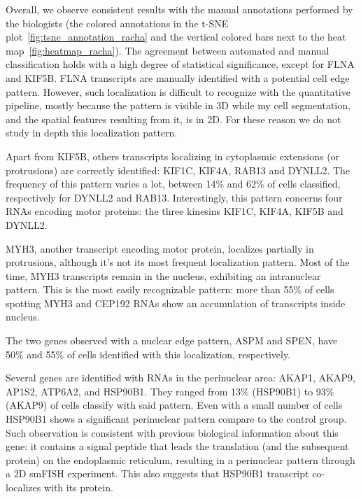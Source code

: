 Overall, we observe consistent results with the manual annotations performed by the biologists (the colored annotations in the \ac{t-SNE} plot~\ref{fig:tsne_annotation_racha} and the vertical colored bars next to the heat map~\ref{fig:heatmap_racha}).
The agreement between automated and manual classification holds with a high degree of statistical significance, except for FLNA and KIF5B.
FLNA transcripts are manually identified with a potential cell edge pattern.
However, such localization is difficult to recognize with the quantitative pipeline, mostly because the pattern is visible in 3D while my cell segmentation, and the spatial features resulting from it, is in 2D.
For these reason we do not study in depth this localization pattern.

Apart from KIF5B, others transcripts localizing in cytoplasmic extensions (or protrusions) are correctly identified: KIF1C, KIF4A, RAB13 and DYNLL2.
The frequency of this pattern varies a lot, between 14\% and 62\% of cells classified, respectively for DYNLL2 and RAB13.
Interestingly, this pattern concerns four \ac{RNA}s encoding motor proteins: the three kinesins KIF1C, KIF4A, KIF5B and DYNLL2.

MYH3, another transcript encoding motor protein, localizes partially in protrusions, although it's not its most frequent localization pattern.
Most of the time, MYH3 transcripts remain in the nucleus, exhibiting an intranuclear pattern.
This is the most easily recognizable pattern: more than 55\% of cells spotting MYH3 and CEP192 \ac{RNA}s show an accumulation of transcripts inside nucleus.

The two genes observed with a nuclear edge pattern, ASPM and SPEN, have 50\% and 55\% of cells identified with this localization, respectively.

Several genes are identified with \ac{RNA}s in the perinuclear area: AKAP1, AKAP9, AP1S2, ATP6A2, and HSP90B1.
They ranged from 13\% (HSP90B1) to 93\% (AKAP9) of cells classify with said pattern.
Even with a small number of cells HSP90B1 shows a significant perinuclear pattern compare to the control group.
Such observation is consistent with previous biological information about this gene: it contains a signal peptide that leads the translation (and the subsequent protein) on the endoplasmic reticulum, resulting in a perinuclear pattern through a 2D \ac{smFISH} experiment.
This also suggests that HSP90B1 transcript co-localizes with its protein.

